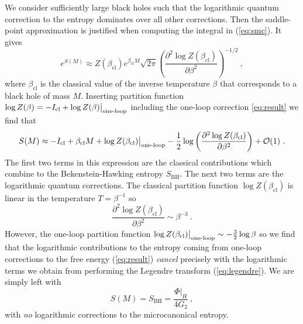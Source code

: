 \documentclass[12pt]{article}
\begin{document}
We consider sufficiently large black holes such that the logarithmic quantum correction to the entropy dominates over all other corrections. Then the saddle-point approximation is justified when computing the integral in (\ref{eq:smc}). It gives
\begin{equation}
	e^{S(M)} \approx Z(\beta_\text{cl})e^{\beta_\text{cl}M} \sqrt{2\pi}\left(\frac{\partial ^2 \log Z(\beta_\text{cl})}{\partial \beta ^2}\right)^{-1/2}~,
\end{equation}
where $\beta_\text{cl}$ is the classical value of the inverse temperature $\beta$ that corresponds to a black hole of mass $M$. Inserting partition function $\log Z(\beta) = - I_\text{cl} + \log Z(\beta)\big{|}_\text{one-loop}$ including the one-loop correction \eqref{eq:result} we find that
\begin{equation}
	S(M) \approx -I_\text{cl} + \beta_\text{cl} M + \log Z(\beta_\text{cl})\big{|}_\text{one-loop} - \frac{1}{2}\log\left(\frac{\partial ^2 \log Z(\beta_\text{cl})}{\partial \beta ^2}\right) + \mathcal{O}(1)~.
\label{eq:legendre}
\end{equation}
The first two terms in this expression are the classical contributions which combine to the Bekenstein-Hawking entropy $S_\text{BH}$. The next two terms are the logarithmic quantum corrections.  
The classical partition function $\log Z(\beta_\text{cl})$ is linear in the temperature $T=\beta^{-1}$ so
\begin{equation}
	\frac{\partial ^2 \log Z(\beta_\text{cl})}{\partial \beta ^2} \sim \beta^{-3}~.
\end{equation}
However, the one-loop partition function $\log Z(\beta_\text{cl})\big{|}_\text{one-loop} \sim -\frac{3}{2}\log \beta$ so we find that the logarithmic contributions to the entropy coming from one-loop corrections to the free energy (\ref{eq:result}) {\it cancel} precisely with the logarithmic terms we obtain from performing the Legendre transform (\ref{eq:legendre}). We are simply left with
\begin{equation}
	S(M) = S_\text{BH} = \frac{\Phi|_H}{4 G_2}~,
\label{eq:slog}
\end{equation}
with {\it no} logarithmic corrections to the microcanonical entropy.
\end{document}
